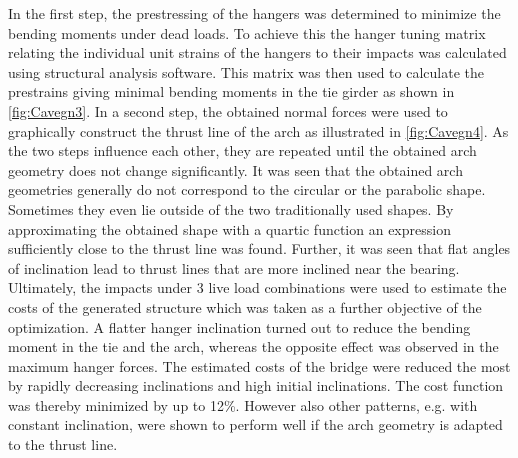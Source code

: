In the first step, the prestressing of the hangers was determined to minimize the bending moments under dead loads. To achieve this the hanger tuning matrix relating the individual unit strains of the hangers to their impacts was calculated using structural analysis software. This matrix was then used to calculate the prestrains giving minimal bending moments in the tie girder as shown in \autoref{fig:Cavegn3}. In a second step, the obtained normal forces were used to graphically construct the thrust line of the arch as illustrated in \autoref{fig:Cavegn4}. As the two steps influence each other, they are repeated until the obtained arch geometry does not change significantly. It was seen that the obtained arch geometries generally do not correspond to the circular or the parabolic shape. Sometimes they even lie outside of the two traditionally used shapes. By approximating the obtained shape with a quartic function an expression sufficiently close to the thrust line was found. Further, it was seen that flat angles of inclination lead to thrust lines that are more inclined near the bearing. Ultimately, the impacts under 3 live load combinations were used to estimate the costs of the generated structure which was taken as a further objective of the optimization. A flatter hanger inclination turned out to reduce the bending moment in the tie and the arch, whereas the opposite effect was observed in the maximum hanger forces. The estimated costs of the bridge were reduced the most by rapidly decreasing inclinations and high initial inclinations. The cost function was thereby minimized by up to 12\%. However also other patterns, e.g. with constant inclination, were shown to perform well if the arch geometry is adapted to the thrust line.
